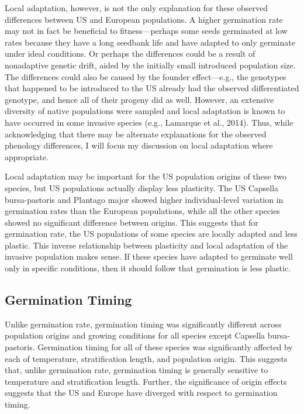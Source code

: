 \documentclass[12pt]{article}\usepackage[]{graphicx}\usepackage[]{color}
\begin{document}
	Local adaptation, however, is not the only explanation for these observed differences between US and European populations. A higher germination rate may not in fact be beneficial to fitness—perhaps some seeds germinated at low rates because they have a long seedbank life and have adapted to only germinate under ideal conditions. Or perhaps the differences could be a result of nonadaptive genetic drift, aided by the initially small introduced population size. The differences could also be caused by the founder effect—e.g., the genotypes that happened to be introduced to the US already had the observed differentiated genotype, and hence all of their progeny did as well. However, an extensive diversity of native populations were sampled and local adaptation is known to have occurred in some invasive species (e.g., Lamarque et al., 2014). Thus, while acknowledging that there may be alternate explanations for the observed phenology differences, I will focus my discussion on local adaptation where appropriate.  
	
	Local adaptation may be important for the US population origins of these two species, but US populations actually display less plasticity. The US Capsella bursa-pastoris and Plantago major showed higher individual-level variation in germination rates than the European populations, while all the other species showed no significant difference between origins. This suggests that for germination rate, the US populations of some species are locally adapted and less plastic. This inverse relationship between plasticity and local adaptation of the invasive population makes sense. If these species have adapted to germinate well only in specific conditions, then it should follow that germination is less plastic. 
	
	
	\subsection{Germination Timing}
	
	
	Unlike germination rate, germination timing was significantly different across population origins and growing conditions for all species except Capsella bursa-pastoris. Germination timing for all of these species was significantly affected by each of temperature, stratification length, and population origin. This suggests that, unlike germination rate, germination timing is generally sensitive to temperature and stratification length. Further, the significance of origin effects suggests that the US and Europe have diverged with respect to germination timing. 
	
\end{document}
